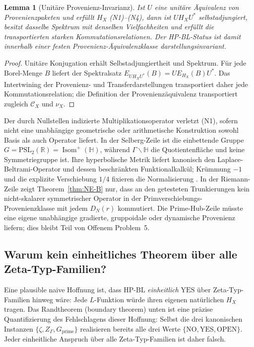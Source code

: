\documentclass[11pt]{article}
\newtheorem{lemma}[theorem]{Lemma}
\theoremstyle{definition}
\theoremstyle{remark}
\newcommand{\HBL}{\mathrm{HP\text{-}BL}}
\newcommand{\PSL}{\mathrm{PSL}}
\begin{document}
\begin{lemma}[Unitäre Provenienz-Invarianz]\label{lem:hp3-unitary}
Ist $U$ eine unitäre Äquivalenz von Provenienzpaketen und erfüllt $H_X$
(N1)--(N4), dann ist $UH_XU^*$ selbstadjungiert, besitzt dasselbe Spektrum
mit denselben Vielfachheiten und erfüllt die transportierten starken
Kommutationsrelationen. Der HP-BL-Status ist damit innerhalb einer festen
Provenienz-Äquivalenzklasse darstellungsinvariant.
\end{lemma}

\begin{proof}
Unitäre Konjugation erhält Selbstadjungiertheit und Spektrum. Für jede
Borel-Menge $B$ liefert der Spektralsatz
$E_{UH_XU^*}(B)=U E_{H_X}(B)U^*$. Das Intertwining der Provenienz- und
Transferdarstellungen transportiert daher jede Kommutationsrelation;
die Definition der Provenienzäquivalenz transportiert zugleich
$\mathcal{C}_X$ und $\nu_X$.
\end{proof}

Der durch Nullstellen indizierte Multiplikationsoperator verletzt (N1),
sofern nicht eine unabhängige geometrische oder arithmetische Konstruktion
sowohl Basis als auch Operator liefert. In der Selberg-Zeile ist die
einbettende Gruppe $G=\PSL_2(\mathbb{R})=
\operatorname{Isom}^+(\mathbb{H})$, während
$\Gamma\backslash\mathbb{H}$ die Quotientenfläche und keine
Symmetriegruppe ist. Ihre hyperbolische Metrik liefert kanonisch den
Laplace-Beltrami-Operator und dessen beschränkten Funktionalkalkül;
Krümmung $-1$ und die explizite Verschiebung $1/4$ fixieren die
Normalisierung \cite{Selberg1956,Marklof2008}. In der Riemann-Zeile
zeigt Theorem~\ref{thm:NE-B} nur, dass an den getesteten Trunkierungen
kein nicht-skalarer symmetrischer Operator in der Primverschiebungs-
Provenienzklasse mit jedem $D_N(r)$ kommutiert. Die Prime-Hub-Zeile
müsste eine eigene unabhängige gradierte, gruppoidale oder dynamische
Provenienz liefern; dies bleibt Teil von Offenem Problem~5.

\subsection{Warum kein einheitliches Theorem über alle Zeta-Typ-Familien?}

Eine plausible naive Hoffnung ist, dass $\HBL$ \emph{einheitlich}
$\mathrm{YES}$ über Zeta-Typ-Familien hinweg wäre: Jede $L$-Funktion würde ihren eigenen
natürlichen $H_X$ tragen. Das Randtheorem (boundary theorem) unten ist eine präzise
Quantifizierung des Fehlschlagens dieser Hoffnung: Selbst die drei kanonischen
Instanzen $\{\zeta, Z_\Gamma, G_\mathrm{prime}\}$ realisieren bereits alle drei
Werte $\{\mathrm{NO}, \mathrm{YES}, \mathrm{OPEN}\}$. Jeder einheitliche
Anspruch über alle Zeta-Typ-Familien ist daher falsch.
\end{document}
